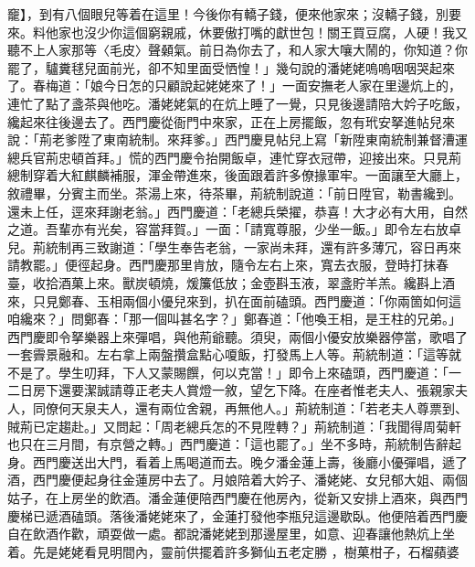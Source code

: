 竉】，到有八個眼兒等着在這里！今後你有轎子錢，便來他家來；沒轎子錢，別要來。料他家也沒少你這個窮親戚，休要傲打嘴的獻世包！關王買豆腐，人硬！我又聽不上人家那等〈毛皮〉聲顙氣。前日為你去了，和人家大嚷大鬧的，你知道？你罷了，驢糞毬兒面前光，卻不知里面受恓惶！」幾句說的潘姥姥嗚嗚咽咽哭起來了。春梅道：「娘今日怎的只顧說起姥姥來了！」一面安撫老人家在里邊炕上的，連忙了點了盞茶與他吃。潘姥姥氣的在炕上睡了一覺，只見後邊請陪大妗子吃飯，纔起來往後邊去了。西門慶從衙門中來家，正在上房擺飯，忽有玳安拏進帖兒來說：「荊老爹陞了東南統制。來拜爹。」西門慶見帖兒上寫「新陞東南統制兼督漕運總兵官荊忠頓首拜。」慌的西門慶令抬開飯卓，連忙穿衣冠帶，迎接出來。只見荊總制穿着大紅麒麟補服，渾金帶進來，後面跟着許多僚掾軍牢。一面讓至大廳上，敘禮畢，分賓主而坐。茶湯上來，待茶畢，荊統制說道：「前日陞官，勒書纔到。還未上任，逕來拜謝老翁。」西門慶道：「老總兵榮擢，恭喜！大才必有大用，自然之道。吾輩亦有光矣，容當拜賀。」一面：「請寬尊服，少坐一飯。」即令左右放卓兒。荊統制再三致謝道：「學生奉告老翁，一家尚未拜，還有許多薄冗，容日再來請教罷。」便徑起身。西門慶那里肯放，隨令左右上來，寬去衣服，登時打抹春臺，收拾酒菓上來。獸炭頓燒，煖簾低放；金壺斟玉液，翠盞貯羊羔。纔斟上酒來，只見鄭春、玉相兩個小優兒來到，扒在面前磕頭。西門慶道：「你兩箇如何這咱纔來？」問鄭春：「那一個叫甚名字？」鄭春道：「他喚王相，是王柱的兄弟。」西門慶即令拏樂器上來彈唱，與他荊爺聽。須臾，兩個小優安放樂器停當，歌唱了一套霽景融和。左右拿上兩盤攢盒點心嗄飯，打發馬上人等。荊統制道：「這等就不是了。學生叨拜，下人又蒙賜饌，何以克當！」即令上來磕頭，西門慶道：「一二日房下還要潔誠請尊正老夫人賞燈一敘，望乞下降。在座者惟老夫人、張親家夫人，同僚何天泉夫人，還有兩位舍親，再無他人。」荊統制道：「若老夫人尊票到、賊荊已定趨赴。」又問起：「周老總兵怎的不見陞轉？」荊統制道：「我聞得周菊軒也只在三月間，有京營之轉。」西門慶道：「這也罷了。」坐不多時，荊統制告辭起身。西門慶送出大門，看着上馬喝道而去。晚夕潘金蓮上壽，後廳小優彈唱，遞了酒，西門慶便起身往金蓮房中去了。月娘陪着大妗子、潘姥姥、女兒郁大姐、兩個姑子，在上房坐的飲酒。潘金蓮便陪西門慶在他房內，從新又安排上酒來，與西門慶梯已遞酒磕頭。落後潘姥姥來了，金蓮打發他李瓶兒這邊歇臥。他便陪着西門慶自在飲酒作歡，頑耍做一處。都說潘姥姥到那邊屋里，如意、迎春讓他熱炕上坐着。先是姥姥看見明間內，靈前供擺着許多獅仙五老定勝 ，樹菓柑子，石榴蘋婆 